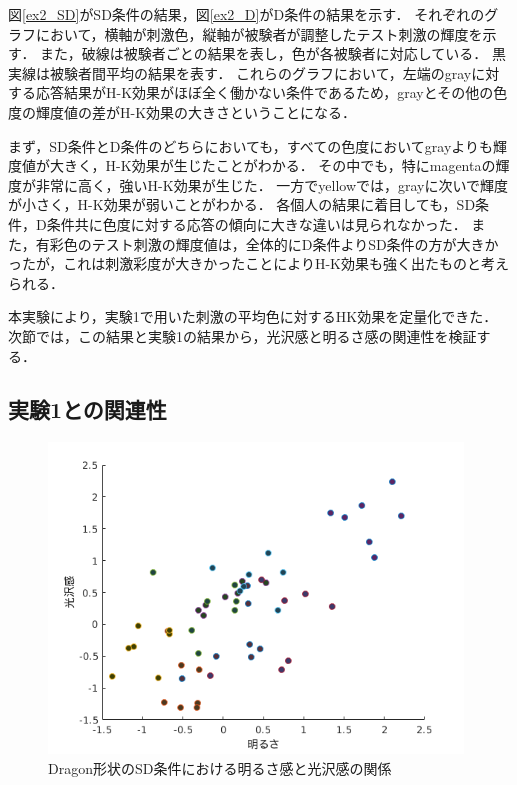             図\ref{ex2_SD}がSD条件の結果，図\ref{ex2_D}がD条件の結果を示す．
            それぞれのグラフにおいて，横軸が刺激色，縦軸が被験者が調整したテスト刺激の輝度を示す．
            また，破線は被験者ごとの結果を表し，色が各被験者に対応している．
            黒実線は被験者間平均の結果を表す．
            これらのグラフにおいて，左端のgrayに対する応答結果がH-K効果がほぼ全く働かない条件であるため，grayとその他の色度の輝度値の差がH-K効果の大きさということになる．
            
            まず，SD条件とD条件のどちらにおいても，すべての色度においてgrayよりも輝度値が大きく，H-K効果が生じたことがわかる．
            その中でも，特にmagentaの輝度が非常に高く，強いH-K効果が生じた．
            一方でyellowでは，grayに次いで輝度が小さく，H-K効果が弱いことがわかる．
            各個人の結果に着目しても，SD条件，D条件共に色度に対する応答の傾向に大きな違いは見られなかった．
            また，有彩色のテスト刺激の輝度値は，全体的にD条件よりSD条件の方が大きかったが，これは刺激彩度が大きかったことによりH-K効果も強く出たものと考えられる．

            本実験により，実験1で用いた刺激の平均色に対するHK効果を定量化できた．
            次節では，この結果と実験1の結果から，光沢感と明るさ感の関連性を検証する．

    \newpage
        \subsection{実験1との関連性}

            \begin{figure}[h]
                \centering
                \includegraphics[width=11.0cm]{./img/ex3_DSD.png}
                \caption{Dragon形状のSD条件における明るさ感と光沢感の関係}
                \label{ex3_DSD}
            \end{figure}

